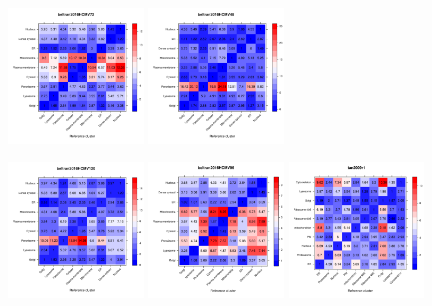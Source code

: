 \documentclass[12pt]{article}\usepackage[]{graphicx}\usepackage[]{color}
\begin{document}
\begin{appendices}
\begin{figure}[htb]
  \includegraphics[width = 0.32\textwidth]{./figure/allhmaps-11.pdf}
  \includegraphics[width = 0.32\textwidth]{./figure/allhmaps-12.pdf}
\end{figure}
\begin{figure}[htb]\ContinuedFloat
  \includegraphics[width = 0.32\textwidth]{./figure/allhmaps-13.pdf}
  \includegraphics[width = 0.32\textwidth]{./figure/allhmaps-14.pdf}
  \includegraphics[width = 0.32\textwidth]{./figure/allhmaps-15.pdf}

\end{figure}
\end{appendices}
\end{document}
